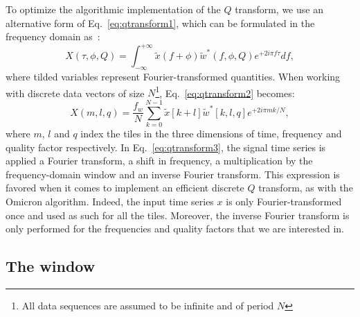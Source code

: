 To optimize the algorithmic implementation of the $Q$ transform, we use an alternative form of Eq.~\ref{eq:qtransform1}, which can be formulated in the frequency domain as~\cite{Chatterji:2004}:
\begin{equation}
  X(\tau, \phi, Q) = \int_{-\infty}^{+\infty}{ \tilde{x}(f+\phi) \tilde{w}^{*}(f,\phi,Q) e^{+2i\pi f \tau}df},
  \label{eq:qtransform2}
\end{equation}
where tilded variables represent Fourier-transformed quantities. When working with discrete data vectors of size $N$\footnote{All data sequences are assumed to be infinite and of period $N$}, Eq.~\ref{eq:qtransform2} becomes:
\begin{equation}
  X(m,l,q) = \frac{f_w}{N}\sum_{k=0}^{N-1}{\tilde{x}[k+l]\tilde{w}^{*}[k,l,q]e^{+2i\pi mk/N}},
  \label{eq:qtransform3}
\end{equation}
where $m$, $l$ and $q$ index the tiles in the three dimensions of time, frequency and quality factor respectively. In Eq.~\ref{eq:qtransform3}, the signal time series is applied a Fourier transform, a shift in frequency, a multiplication by the frequency-domain window and an inverse Fourier transform. This expression is favored when it comes to implement an efficient discrete $Q$ transform, as with the Omicron algorithm. Indeed, the input time series $x$ is only Fourier-transformed once and used as such for all the tiles. Moreover, the inverse Fourier transform is only performed for the frequencies and quality factors that we are interested in.

\subsection{The window} \label{sec:analysis:window}

